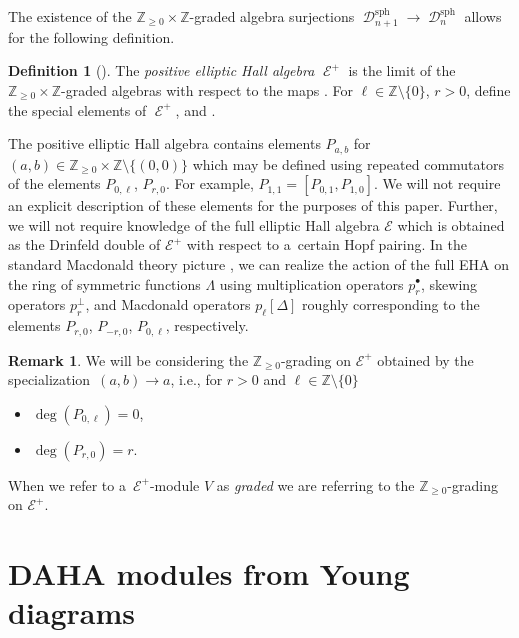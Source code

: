 \documentclass[10pt,a4paper]{amsart}
\numberwithin{equation}{section}
\theoremstyle{definition}
\newtheorem{Definition}[Theorem]{Definition}
\newtheorem{Remark}[Theorem]{Remark}
\DeclareMathOperator{\sD}{\mathscr{D}}
\DeclareMathOperator{\sE}{\mathcal{E}}
\begin{document}
The existence of the $\mathbb{Z}_{\geq 0}\times \mathbb{Z}$-graded algebra surjections $\sD_{n+1}^{\mathrm{sph}}\rightarrow \sD_n^{\mathrm{sph}}$ allows for the following definition.

\begin{Definition}[{\cite[Section~1.3]{SV}}]\label{EHA def}
 The \textit{positive elliptic Hall algebra} $\sE^{+}$ is the limit of the $\mathbb{Z}_{\geq0}\times \mathbb{Z}$-graded algebras \smash{$\sD_n^{\mathrm{sph}}$} with respect to the maps \smash{$\sD_{n+1}^{\mathrm{sph}}\rightarrow \sD_n^{\mathrm{sph}}$}. For $\ell \in \mathbb{Z}\setminus \{0\}$, $r > 0$, define the special elements of $\sE^{+}$,  and .
\end{Definition}

The positive elliptic Hall algebra contains elements $P_{a,b}$ for $(a,b) \in \mathbb{Z}_{\geq0}\times \mathbb{Z} \setminus \{(0,0)\}$ which may be defined using repeated commutators of the elements $P_{0,\ell}$, $P_{r,0}$. For example, $P_{1,1} = [P_{0,1},P_{1,0}]$. We will not require an explicit description of these elements for the purposes of this paper. Further, we will not require knowledge of the full elliptic Hall algebra $\mathcal{E}$ which is obtained as the Drinfeld double of $\mathcal{E}^{+}$ with respect to a~certain Hopf pairing. In the standard Macdonald theory picture \cite[Corollary~1.5]{SV}, we can realize the action of the full EHA on the ring of symmetric functions $\Lambda$ using multiplication operators $p_{r}^{\bullet}$, skewing operators $p_{r}^{\perp}$, and Macdonald operators $p_{\ell}[\Delta]$ roughly corresponding to the elements $P_{r,0}$, $P_{-r,0}$, $P_{0,\ell}$, respectively.

\begin{Remark}
 We will be considering the $\mathbb{Z}_{\geq 0}$-grading on $\mathcal{E}^{+}$ obtained by the specialization~${(a,b) \rightarrow a}$, i.e., for $r > 0$ and $\ell \in \mathbb{Z}\setminus \{0\}$
 \begin{itemize}
\itemsep=0pt
 \item $\deg(P_{0,\ell}) = 0$,
 \item $\deg(P_{r,0}) = r$.
 \end{itemize} When we refer to a~$\mathcal{E}^{+}$-module $V$ as \textit{graded} we are referring to the $\mathbb{Z}_{\geq 0}$-grading on $\mathcal{E}^{+}$.
\end{Remark}


\section{DAHA modules from Young diagrams}\label{DAHA Modules from Young Diagrams}
\end{document}
